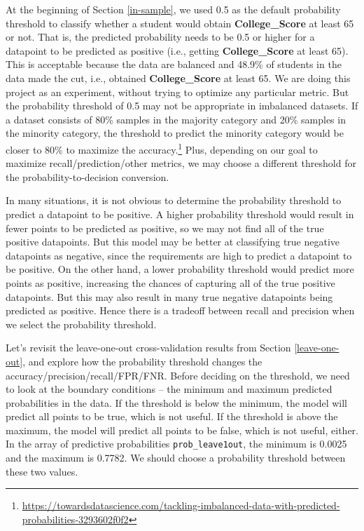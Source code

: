 \documentclass[
]{article}
\begin{document}
At the beginning of Section \ref{in-sample}, we used 0.5 as the default
probability threshold to classify whether a student would obtain
\textbf{College\_Score} at least 65 or not. That is, the predicted
probability needs to be 0.5 or higher for a datapoint to be predicted as
positive (i.e., getting \textbf{College\_Score} at least 65). This is
acceptable because the data are balanced and 48.9\% of students in the
data made the cut, i.e., obtained \textbf{College\_Score} at least 65.
We are doing this project as an experiment, without trying to optimize
any particular metric. But the probability threshold of 0.5 may not be
appropriate in imbalanced datasets. If a dataset consists of 80\%
samples in the majority category and 20\% samples in the minority
category, the threshold to predict the minority category would be closer
to 80\% to maximize the accuracy.\footnote{\url{https://towardsdatascience.com/tackling-imbalanced-data-with-predicted-probabilities-3293602f0f2}}
Plus, depending on our goal to maximize recall/prediction/other metrics,
we may choose a different threshold for the probability-to-decision
conversion.

In many situations, it is not obvious to determine the probability
threshold to predict a datapoint to be positive. A higher probability
threshold would result in fewer points to be predicted as positive, so
we may not find all of the true positive datapoints. But this model may
be better at classifying true negative datapoints as negative, since the
requirements are high to predict a datapoint to be positive. On the
other hand, a lower probability threshold would predict more points as
positive, increasing the chances of capturing all of the true positive
datapoints. But this may also result in many true negative datapoints
being predicted as positive. Hence there is a tradeoff between recall
and precision when we select the probability threshold.

Let's revisit the leave-one-out cross-validation results from Section
\ref{leave-one-out}, and explore how the probability threshold changes
the accuracy/precision/recall/FPR/FNR. Before deciding on the threshold,
we need to look at the boundary conditions -- the minimum and maximum
predicted probabilities in the data. If the threshold is below the
minimum, the model will predict all points to be true, which is not
useful. If the threshold is above the maximum, the model will predict
all points to be false, which is not useful, either. In the array of
predictive probabilities \texttt{prob\_leave1out}, the minimum is 0.0025
and the maximum is 0.7782. We should choose a probability threshold
between these two values.
\end{document}
